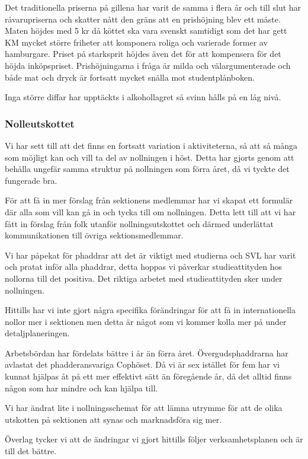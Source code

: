 \documentclass[../_main/handlingar.tex]{subfiles}
\begin{document}
Det traditionella priserna på gillena har varit de samma i flera år och till slut har råvarupriserna och skatter nått den gräns att en prishöjning blev ett måste. Maten höjdes med 5 kr då köttet ska vara svenskt samtidigt som det har gett KM mycket större friheter att komponera roliga och varierade former av hamburgare. Priset på starksprit höjdes även det för att kompensera för det höjda inköpspriset. Prishöjningarna i fråga är milda och välargumenterade och både mat och dryck är fortsatt mycket snälla mot studentplånboken.

Inga större diffar har upptäckts i alkohollagret så svinn hålls på en låg nivå.
\newpage
\subsubsection*{Nolleutskottet}
Vi har sett till att det finns en fortsatt variation i aktiviteterna, så att så många som möjligt kan och vill ta del av nollningen i höst. Detta har gjorts genom att behålla ungefär samma struktur på nollningen som förra året, då vi tyckte det fungerade bra.

För att få in mer förslag från sektionens medlemmar har vi skapat ett formulär där alla som vill kan gå in och tycka till om nollningen. Detta lett till att vi har fått in förslag från folk utanför nollningsutskottet och därmed underlättat kommunikationen till övriga sektionsmedlemmar.

Vi har påpekat för phaddrar att det är viktigt med studierna och SVL har varit och pratat inför alla phaddrar, detta hoppas vi påverkar studieattityden hos nollorna till det positiva. Det riktiga arbetet med studieattityden sker under nollningen.

Hittills har vi inte gjort några specifika förändringar för att få in internationella nollor mer i sektionen men detta är något som vi kommer kolla mer på under detaljplaneringen.

Arbetsbördan har fördelats bättre i år än förra året. Övergudsphaddrarna har avlastat det phadderansvariga Cophöset. Då vi är sex istället för fem har vi kunnat hjälpas åt på ett mer effektivt sätt än föregående år, då det alltid finns någon som har mindre och kan hjälpa till.

Vi har ändrat lite i nollningsschemat för att lämna utrymme för att de olika utskotten på sektionen att synas och marknadsföra sig mer.

Överlag tycker vi att de ändringar vi gjort hittills följer verksamhetsplanen och är till det bättre.
\end{document}
